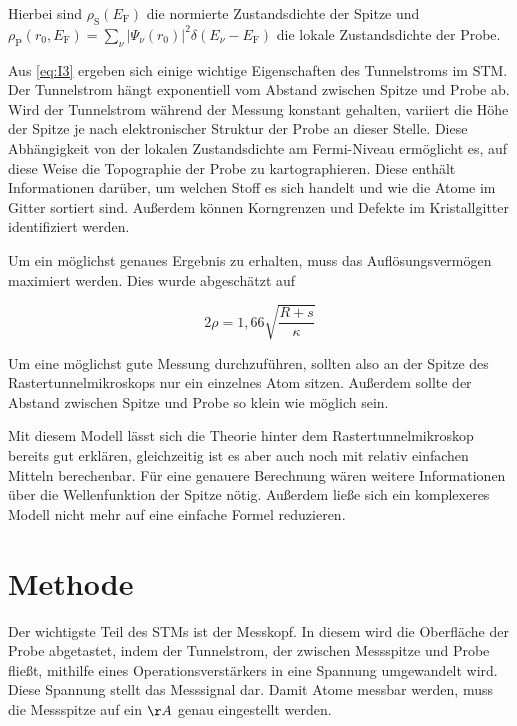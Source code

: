 \documentclass[
	a4paper,
	12pt,
	pagesize,
	ngerman
]{scrartcl}
\begin{document}
Hierbei sind $\rho_\text{S}(E_\text{F})$ die normierte Zustandsdichte der Spitze und\\ $\rho_\text{P}(r_0, E_\text{F}) = \sum_{\nu} |\Psi_\nu(r_0)|^2 \delta(E_\nu - E_\text{F})$ die lokale Zustandsdichte der Probe.

Aus \cref{eq:I3} ergeben sich einige wichtige Eigenschaften des Tunnelstroms im STM. Der Tunnelstrom hängt exponentiell vom Abstand zwischen Spitze und Probe ab.
Wird der Tunnelstrom während der Messung konstant gehalten, variiert die Höhe der Spitze je nach elektronischer Struktur der Probe an dieser Stelle. Diese Abhängigkeit von der lokalen Zustandsdichte am Fermi-Niveau ermöglicht es, auf diese Weise die Topographie der Probe zu kartographieren. Diese enthält Informationen darüber, um welchen Stoff es sich handelt und wie die Atome im Gitter sortiert sind. Außerdem können Korngrenzen und Defekte im Kristallgitter identifiziert werden.

Um ein möglichst genaues Ergebnis zu erhalten, muss das Auflösungsvermögen maximiert werden. Dies wurde abgeschätzt auf

\begin{equation}
	2\rho = 1,66 \sqrt{\frac{R + s}{\kappa}}
	\label{eq:sigma}
\end{equation}

Um eine möglichst gute Messung durchzuführen, sollten also an der Spitze des Rastertunnelmikroskops nur ein einzelnes Atom sitzen. Außerdem sollte der Abstand zwischen Spitze und Probe so klein wie möglich sein.

Mit diesem Modell lässt sich die Theorie hinter dem Rastertunnelmikroskop bereits gut erklären, gleichzeitig ist es aber auch noch mit relativ einfachen Mitteln berechenbar. Für eine genauere Berechnung wären weitere Informationen über die Wellenfunktion der Spitze nötig. Außerdem ließe sich ein komplexeres Modell nicht mehr auf eine einfache Formel reduzieren.

\newpage


\section{Methode}
Der wichtigste Teil des STMs ist der Messkopf. In diesem wird die Oberfläche der Probe abgetastet, indem der Tunnelstrom, der zwischen Messspitze und Probe fließt, mithilfe eines Operationsverstärkers in eine Spannung umgewandelt wird. Diese Spannung stellt das Messsignal dar. Damit Atome messbar werden, muss die Messspitze auf ein $\AA$ genau eingestellt werden. 
\end{document}

